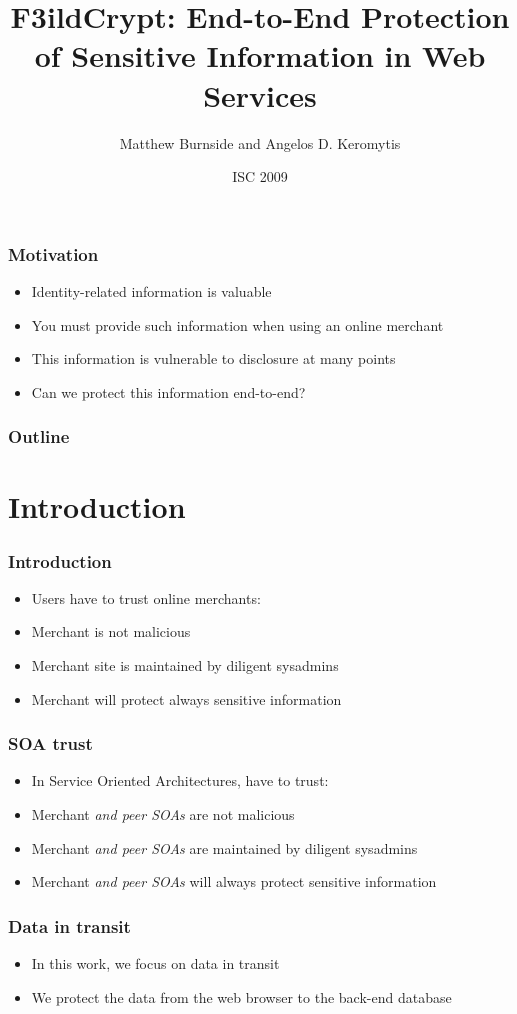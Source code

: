 \documentclass{beamer}
\title[F3ildCrypt]{F3ildCrypt: End-to-End Protection of Sensitive Information
in Web Services}
\author[Burnside, Keromytis]{Matthew Burnside and Angelos D. Keromytis}
\institute[Columbia University]{
Department of Computer Science\\
Columbia University\\
\texttt{\{mb, angelos\}@cs.columbia.edu}
}
\date{ISC 2009}
\begin{document}
\begin{frame}[plain]
    \titlepage
\end{frame}

\begin{frame}
\frametitle{Motivation}
\begin{itemize}
\item Identity-related information is valuable
\item You must provide such information when using an online merchant
\item This information is vulnerable to disclosure at many points
\item Can we protect this information end-to-end?
\end{itemize}
\end{frame}

\begin{frame}
\frametitle{Outline}
\tableofcontents
\end{frame}

\section{Introduction}

\begin{frame}
\frametitle{Introduction}
\begin{itemize}
\item Users have to trust online merchants:
\item Merchant is not malicious
\item Merchant site is maintained by diligent sysadmins
\item Merchant will protect always sensitive information
\end{itemize}
\end{frame}

\begin{frame}
\frametitle{SOA trust}
\begin{itemize}
\item In Service Oriented Architectures, have to trust:
\item Merchant \emph{and peer SOAs} are not malicious
\item Merchant \emph{and peer SOAs} are maintained by diligent sysadmins
\item Merchant \emph{and peer SOAs} will always protect sensitive information
\end{itemize}
\end{frame}

\begin{frame}
\frametitle{Data in transit}
\begin{itemize}
\item In this work, we focus on data in transit
\item We protect the data from the web browser to the back-end database
\end{itemize}
\end{frame}
\end{document}

